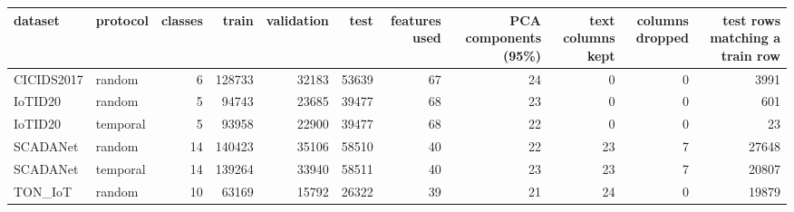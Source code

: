 \begin{tabular}{llrrrrrrrrr}
\toprule
dataset & protocol & classes & train & validation & test & features used & PCA components (95\%) & text columns kept & columns dropped & test rows matching a train row \\
\midrule
CICIDS2017 & random & 6 & 128733 & 32183 & 53639 & 67 & 24 & 0 & 0 & 3991 \\
IoTID20 & random & 5 & 94743 & 23685 & 39477 & 68 & 23 & 0 & 0 & 601 \\
IoTID20 & temporal & 5 & 93958 & 22900 & 39477 & 68 & 22 & 0 & 0 & 23 \\
SCADANet & random & 14 & 140423 & 35106 & 58510 & 40 & 22 & 23 & 7 & 27648 \\
SCADANet & temporal & 14 & 139264 & 33940 & 58511 & 40 & 23 & 23 & 7 & 20807 \\
TON\_IoT & random & 10 & 63169 & 15792 & 26322 & 39 & 21 & 24 & 0 & 19879 \\
\bottomrule
\end{tabular}
